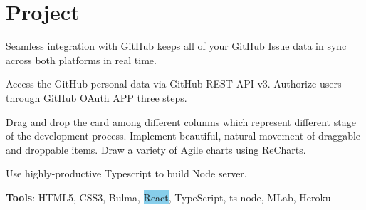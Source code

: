 \documentclass[letterpaper]{deedy-resume} %
\begin{document}
\begin{minipage}[t]{0.66\textwidth}
\begin{tightitemize}
\end{tightitemize}
\sectionspace
\section{Project}

\vspace{\topsep} %
\begin{tightitemize}
	\item Seamless integration with GitHub keeps all of your GitHub Issue data in sync across both platforms in real time.
	\item Access the GitHub personal data via GitHub REST API v3. Authorize users through GitHub OAuth APP three steps.
	\item Drag and drop the card among different columns which represent different stage of the development process. Implement beautiful, natural movement of draggable and droppable items. Draw a variety of Agile charts using ReCharts.
	\item Use highly-productive Typescript to build Node server.
	\item \textbf{Tools}: HTML5, CSS3, Bulma, \colorbox{SkyBlue}{React}, TypeScript, ts-node, MLab, Heroku
\end{tightitemize}





\sectionspace %

\vspace{\topsep} %






\end{minipage}
\end{document}
